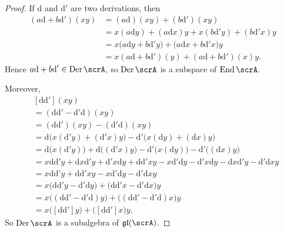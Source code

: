\documentclass{article}
\newcommand{\lb}[1]{\ensuremath{\left[{#1}\right]}}
\DeclareMathOperator{\End}{End}
\DeclareMathOperator{\Der}{Der}
\newcommand{\dd}{\ensuremath{\text{d}}}
\newcommand{\glalg}{\ensuremath{\mathfrak{gl}}}
\begin{document}
\begin{proof}
    If $\dd$ and $\dd'$ are two derivations, then
    \begin{align*}
        (a\dd + b\dd')(xy)
        &=
        (a\dd)(xy) + (b\dd')(xy)
        \\
        &=
        x(a\dd y) + (a\dd x)y
        +
        x(b\dd'y) + (b\dd'x)y
        \\
        &=
        x
        \Big(
            a\dd y + b\dd'y
        \Big)
        +
        \Big(
            a\dd x + b\dd'x
        \Big)
        y
        \\
        &=
        x(a\dd + b\dd')(y)
        +
        (a\dd + b\dd')(x)y.
    \end{align*}
    Hence $a\dd + b\dd' \in \Der \scrA$, so $\Der \scrA$ is a subspace of $\End \scrA$.

    Moreover, 
    \begin{align*}
        &\lb{\dd\dd'}(xy)
        \\
        &=
        (\dd\dd' - \dd'\dd)(xy)
        \\
        &=
        (\dd\dd')(xy) - (\dd'\dd)(xy)
        \\
        &=
        \dd
        \Big(
            x(\dd'y) + (\dd'x)y
        \Big)
        -
        \dd'
        \Big(
            x(\dd y) + (\dd x)y
        \Big)
        \\
        &=
        \dd\Big(x(\dd'y)\Big) 
        +
        \dd\Big((\dd'x)y\Big) 
        -
        \dd'\Big(x(\dd y)\Big) 
        -
        \dd'\Big((\dd x)y\Big) 
        \\
        &=
        x\dd\dd'y
        +
        \dd x \dd' y
        +
        \dd'x \dd y
        +
        \dd\dd'x y
        -
        x\dd'\dd y
        -
        \dd' x \dd y
        -
        \dd x \dd' y
        -
        \dd' \dd x y
        \\
        &=
        x\dd\dd'y
        +
        \dd\dd'x y
        -
        x\dd'\dd y
        -
        \dd' \dd x y
        \\
        &=
        x
        \Big(
            \dd\dd'y - \dd'\dd y
        \Big)
        +
        \Big(
            \dd\dd'x - \dd'\dd x 
        \Big)
        y
        \\
        &=
        x\Big((\dd\dd' - \dd'\dd)y\Big)
        +
        \Big((\dd\dd' - \dd'\dd)x\Big)y
        \\
        &=
        x\Big(\lb{\dd\dd'}y\Big)
        +
        \Big(\lb{\dd\dd'}x\Big)y.
    \end{align*}
    So $\Der \scrA$ is a subalgebra of $\glalg(\scrA)$.
\end{proof}
\end{document}
